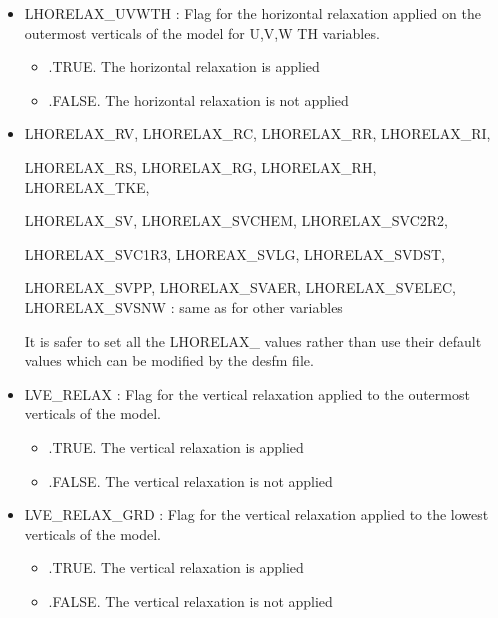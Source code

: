 \begin{itemize}
\item
{}
LHORELAX\_UVWTH : Flag for the horizontal relaxation applied on the
outermost verticals of the model for U,V,W TH variables. 
\begin{itemize}
\item   .TRUE. The horizontal  relaxation is applied 
\item   .FALSE. The horizontal  relaxation is not applied 
\end{itemize}

\item
{}
LHORELAX\_RV, LHORELAX\_RC, LHORELAX\_RR, LHORELAX\_RI,


LHORELAX\_RS, LHORELAX\_RG, LHORELAX\_RH, LHORELAX\_TKE,


LHORELAX\_SV, LHORELAX\_SVCHEM, LHORELAX\_SVC2R2,


LHORELAX\_SVC1R3, LHOREAX\_SVLG, LHORELAX\_SVDST,


LHORELAX\_SVPP, LHORELAX\_SVAER, LHORELAX\_SVELEC, LHORELAX\_SVSNW  : same as for other variables

It is safer to set all the LHORELAX\_ values rather than
use their default values which can be modified by the desfm file.

\item
{}
LVE\_RELAX : Flag for the vertical relaxation applied to the outermost
verticals of the model. 
\begin{itemize}
\item   .TRUE. The vertical  relaxation is applied 
\item   .FALSE. The vertical    relaxation is not applied 
\end{itemize}

\item
{}
LVE\_RELAX\_GRD : Flag for the vertical relaxation applied to the lowest
verticals of the model. 
\begin{itemize}
\item   .TRUE. The vertical  relaxation is applied 
\item   .FALSE. The vertical    relaxation is not applied 
\end{itemize}



\end{itemize}
